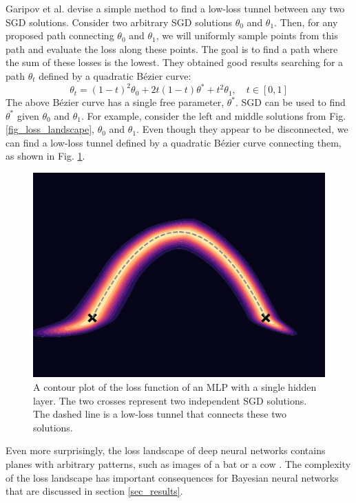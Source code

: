 \documentclass[12pt]{article}
\begin{document}
Garipov et al. \cite{mode_connectivity} devise a simple method to find a low-loss tunnel between any two SGD solutions. Consider two arbitrary SGD solutions $\theta_0$ and $\theta_1$. Then, for any proposed path connecting $\theta_0$ and $\theta_1$, we will uniformly sample points from this path and evaluate the loss along these points. The goal is to find a path where the sum of these losses is the lowest. They obtained good results searching for a path $\theta_t$ defined by a quadratic Bézier curve:
\begin{equation}
\theta_t = (1-t)^2 \theta_0 + 2t(1-t) \theta^* + t^2 \theta_1, \quad t \in [0, 1]
\end{equation}
The above Bézier curve has a single free parameter, $\theta^*$. SGD can be used to find $\theta^*$ given $\theta_0$ and $\theta_1$. For example, consider the left and middle solutions from Fig. \ref{fig_loss_landscape}, $\theta_0$ and $\theta_1$. Even though they appear to be disconnected, we can find a low-loss tunnel defined by a quadratic Bézier curve connecting them, as shown in Fig. \ref{fig_mode_connectivity}.

\begin{figure}[H]
\centering
\includegraphics[width=12cm]{plots/mode_connectivity.pdf}
\caption{A contour plot of the loss function of an MLP with a single hidden layer. The two crosses represent two independent SGD solutions. The dashed line is a low-loss tunnel that connects these two solutions.}
\label{fig_mode_connectivity}
\end{figure}

Even more surprisingly, the loss landscape of deep neural networks contains planes with arbitrary patterns, such as images of a bat or a cow \cite{sightseeing}. The complexity of the loss landscape has important consequences for Bayesian neural networks that are discussed in section \ref{sec_results}.
\end{document}
